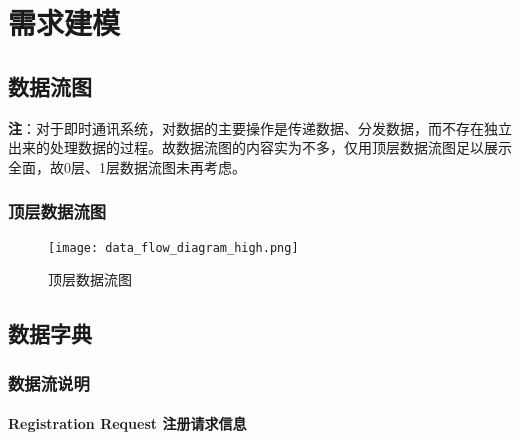 \chapter{需求建模 }
\section{数据流图}

    \textbf{注}：对于即时通讯系统，对数据的主要操作是传递数据、分发数据，而不存在独立出来的处理数据的过程。故数据流图的内容实为不多，仅用顶层数据流图足以展示全面，故0层、1层数据流图未再考虑。
\subsection{顶层数据流图}


\begin{figure}[ht]
    \centering
    \texttt{[image: data\_flow\_diagram\_high.png]}
    \caption{顶层数据流图}\label{fig:figure1}
    
    \end{figure}





\section{数据字典}
\subsection{数据流说明}
\subsubsection{Registration Request 注册请求信息}

